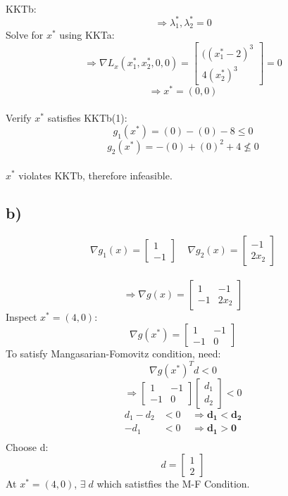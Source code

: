\documentclass{article}
\begin{document}
\\
\hspace*{20mm}
KKTb:
$$\Rightarrow \lambda_1^*, \lambda_2^*=0$$
\hspace*{20mm}
Solve for $x^*$ using KKTa:
$$\Rightarrow \nabla L_x(x_1^*,x_2^*,0,0) = 
\begin{bmatrix}
((x_1^*-2)^3\\
4(x_2^*)^3
\end{bmatrix}
=0
$$
$$\Rightarrow x^*=(0,0)$$
\\
\hspace*{20mm}
Verify $x^*$ satisfies KKTb(1):
$$g_1(x^*)=(0)-(0)-8\leq0$$
$$g_2(x^*)=-(0)+(0)^2+4\nleq0$$
\\
\hspace*{20mm}
$x^*$ violates KKTb, therefore infeasible.

\subsection*{b)}\label{ssec:name}
$$\nabla g_1(x) = 
\begin{bmatrix}
1\\
-1
\end{bmatrix}
\;\;\;\;
\nabla g_2(x)=
\begin{bmatrix}
-1\\
2x_2
\end{bmatrix}
$$\\
$$\Rightarrow \nabla g(x)=
\begin{bmatrix}
1 & -1\\
-1 & 2x_2
\end{bmatrix}
$$
Inspect $x^*=(4,0)$:
$$\nabla g(x^*) = 
\begin{bmatrix}
1 & -1\\
-1 & 0
\end{bmatrix}
$$
To satisfy Mangasarian-Fomovitz condition, need:
$$
\nabla g(x^*)^Td<0$$
$$\Rightarrow
\begin{bmatrix}
1 & -1\\
-1 & 0
\end{bmatrix}
\begin{bmatrix}
d_1\\
d_2
\end{bmatrix}
<0
$$
\begin{align*}
d_1-d_2&<0\;\;\;\;\Rightarrow \mathbf{d_1<d_2}\\
-d_1&<0\;\;\;\;\Rightarrow \mathbf{d_1>0}\\
\end{align*}
Choose d:
$$d=
\begin{bmatrix}
1\\
2
\end{bmatrix}
$$ 
At $x^*=(4,0)$, $\exists\; d$ which satistfies the M-F Condition.
\end{document}
